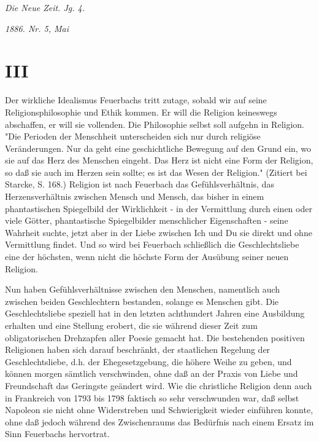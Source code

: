 \pagebreak

\hfill\emph{Die Neue Zeit. Jg. 4.}

\hfill\emph{1886. Nr. 5, Mai}

\section{III}


Der wirkliche Idealismus Feuerbachs tritt zutage, sobald wir auf
seine Religionsphilosophie und Ethik kommen. Er will die Religion
keineswegs abschaffen, er will sie vollenden. Die Philosophie selbst
soll aufgehn in Religion. "Die Perioden der Menschheit unterscheiden
sich nur durch religiöse Veränderungen. Nur da geht eine geschichtliche
Bewegung auf den Grund ein, wo sie auf das Herz des Menschen eingeht.
Das Herz ist nicht eine Form der Religion, so daß sie auch im Herzen
sein sollte; es ist das Wesen der Religion." (Zitiert bei Starcke, S.
168.) Religion ist nach Feuerbach das Gefühlsverhältnis, das
Herzensverhältnis zwischen Mensch und Mensch, das bisher in einem
phantastischen Spiegelbild der Wirklichkeit - in der Vermittlung durch
einen oder viele Götter, phantastische Spiegelbilder menschlicher
Eigenschaften - seine Wahrheit suchte, jetzt aber in der Liebe zwischen
Ich und Du sie direkt und ohne Vermittlung findet. Und so wird bei
Feuerbach schließlich die Geschlechtsliebe eine der höchsten, wenn nicht
die höchste Form der Ausübung seiner neuen Religion.

Nun haben Gefühlsverhältnisse zwischen den Menschen, namentlich
auch zwischen beiden Geschlechtern bestanden, solange es Menschen gibt.
Die Geschlechtsliebe speziell hat in den letzten achthundert Jahren eine
Ausbildung erhalten und eine Stellung erobert, die sie während dieser
Zeit zum obligatorischen Drehzapfen aller Poesie gemacht hat. Die
bestehenden positiven Religionen haben sich darauf beschränkt, der
staatlichen Regelung der Geschlechtsliebe, d.h. der Ehegesetzgebung, die
höhere Weihe zu geben, und können morgen sämtlich verschwinden, ohne daß
an der Praxis von Liebe und Freundschaft das Geringste geändert wird.
Wie die christliche Religion denn auch in Frankreich von 1793 bis 1798
faktisch so sehr verschwunden war, daß selbst Napoleon sie nicht ohne
Widerstreben und Schwierigkeit wieder einführen konnte, ohne daß jedoch
während des Zwischenraums das Bedürfnis nach einem Ersatz im Sinn
Feuerbachs hervortrat.

